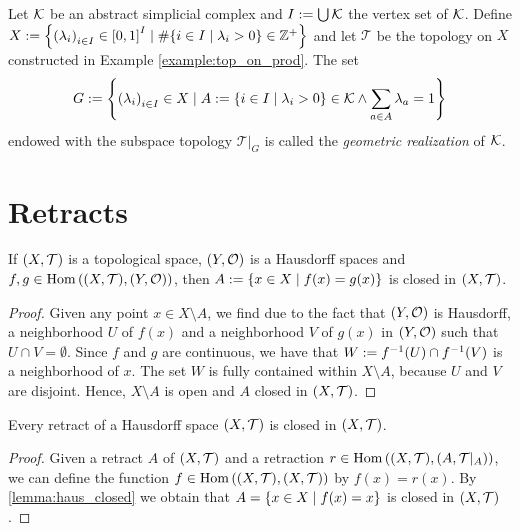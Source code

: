 \begin{definition}\label{def:geom_real}
	Let $\mathcal{K}$ be an abstract simplicial complex and $I := \bigcup \mathcal{K}$ the vertex set of $\mathcal{K}$. Define $X:= {\left \{ {\left ( \lambda_i \right )}_{i \in I} \in {\left [ 0,1 \right ]}^I \mid \# {\left \{ i \in I \mid \lambda_i > 0 \right \}} \in \mathbb Z^+ \right \}}$ and let $\mathcal{T}$ be the topology on $X$ constructed in Example \ref{example:top_on_prod}. The set 
	\begin{align*}
		G := {\left \{ {\left ( \lambda_i \right )}_{i \in I} \in X \mid A:={\left \{ i \in I\mid \lambda_i > 0 \right \}} \in \mathcal{K} \land \sum_{a \in A} \lambda_a = 1 \right \}}
	\end{align*}
	endowed with the subspace topology $\mathcal{T}\vert_G$ is called the \textit{geometric realization} of $\mathcal{K}$. 
\end{definition}


\section{Retracts}

\begin{lemma}\label{lemma:haus_closed}
	If $\tspace$ is a topological space, $\tspace[Y][O]$ is a Hausdorff spaces and $f,g \in \Hom\pbraces{\tspace, \tspace[Y][O]}$, then $A := {\left \{ x \in X \mid f(x) = g(x) \right \}}$ is closed in $\tspace$. 
\end{lemma}
\begin{proof}
	Given any point $x \in X \setminus A$, we find due to the fact that $\tspace[Y][O]$ is Hausdorff, a neighborhood $U$ of $f(x)$ and a neighborhood $V$ of $g(x)$ in $\tspace[Y][O]$ such that $U \cap V = \emptyset$. Since $f$ and $g$ are continuous, we have that $W := f^{-1}{\left ( U \right )} \cap f^{-1}{\left ( V \right )}$ is a neighborhood of $x$. The set $W$ is fully contained within $X \setminus A$, because $U$ and $V$ are disjoint. Hence, $X \setminus A$ is open and $A$ closed in $\tspace$. 
\end{proof}

\begin{lemma}
	Every retract of a Hausdorff space $\tspace$ is closed in $\tspace$. 
\end{lemma}
\begin{proof}
	Given a retract $A$ of $\tspace$ and a retraction $r \in \Hom\pbraces{\tspace, \reltspace}$, we can define the function $f \in \Hom\pbraces{\tspace, \tspace}$ by $f(x) = r(x)$. By \ref{lemma:haus_closed} we obtain that $A = {\left \{ x \in X \mid f(x) = x \right \}}$ is closed in $\tspace$. 
\end{proof}
